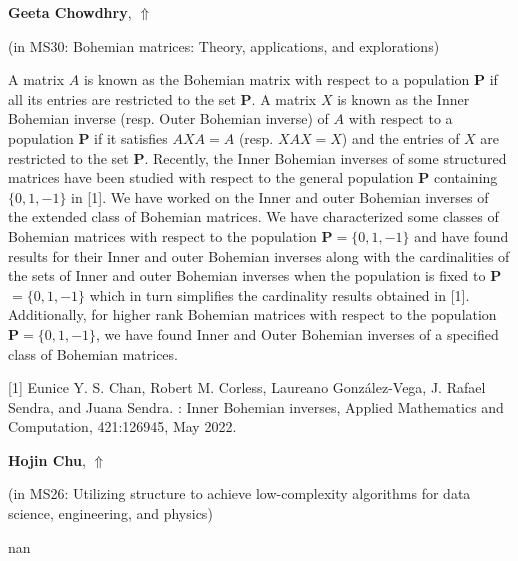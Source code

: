\documentclass[ILAS2025-program.tex]{subfiles}
\begin{document}
\hypertarget{down0232}{}\begin{ilasabstract}
    
\textbf{Geeta Chowdhry},  \hfill \hyperlink{up0232}{$\Uparrow$}
    
    
(in {\color{mstitle}MS30: Bohemian matrices: Theory, applications, and explorations})
        
\mtskip
    A matrix $A$ is known as the Bohemian matrix with respect to a population \textbf{P} if all its entries are restricted to the set \textbf{P}. A matrix $X$ is known as the Inner Bohemian inverse (resp. Outer Bohemian inverse) of $A$ with respect to a population \textbf{P} if it satisfies $AXA=A$ (resp. $XAX=X$) and the entries of $X$ are restricted to the set \textbf{P}.
Recently, the Inner Bohemian inverses of some structured matrices have been studied with respect to the general population \textbf{P} containing $\{0,1,-1\}$ in [1]. We have worked on the Inner and outer Bohemian inverses of the extended class of Bohemian matrices. We have characterized some classes of Bohemian matrices with respect to the population \textbf{P}$=\{0,1,-1\}$ and have found results for their Inner and outer Bohemian inverses along with the cardinalities of the sets of Inner and outer Bohemian inverses when the population is fixed to \textbf{P}$=\{0,1,-1\}$ which in turn simplifies the cardinality results obtained in [1]. Additionally, for higher rank Bohemian matrices with respect to the population \textbf{P}$=\{0,1,-1\}$, we have found Inner and Outer Bohemian inverses of a specified class of Bohemian matrices.

\mbox{[1]} Eunice Y. S. Chan, Robert M. Corless, Laureano González-Vega, J. Rafael Sendra, and Juana Sendra. : Inner Bohemian inverses, Applied Mathematics and Computation, 421:126945, May 2022.

\end{ilasabstract}
    

\hypertarget{down0136}{}\begin{ilasabstract}
    
\textbf{Hojin Chu},  \hfill \hyperlink{up0136}{$\Uparrow$}
    
    
(in {\color{mstitle}MS26: Utilizing structure to achieve low-complexity algorithms for data science, engineering, and physics})
        
\mtskip
    nan
\end{ilasabstract}
    
\end{document}
